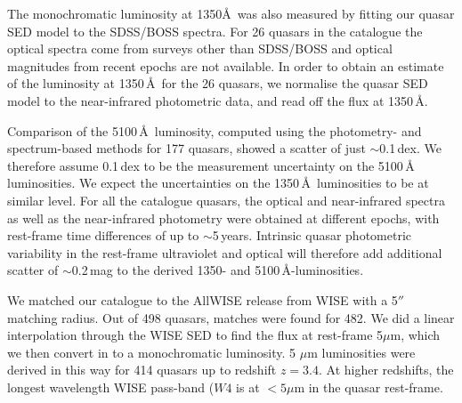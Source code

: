 The monochromatic luminosity at 1350\AA\, was also measured by fitting our quasar SED model to the SDSS/BOSS spectra. 
For 26 quasars in the catalogue the optical spectra come from surveys other than SDSS/BOSS and optical magnitudes from recent epochs are not available. 
In order to obtain an estimate of the luminosity at 1350\,\AA\, for the 26 quasars, we normalise the quasar SED model to the near-infrared photometric data, and read off the flux at 1350\,\AA. 

Comparison of the 5100\,\AA\, luminosity, computed using the photometry- and spectrum-based methods for 177 quasars, showed a scatter of just $\sim$0.1\,dex.
We therefore assume 0.1\,dex to be the measurement uncertainty on the 5100\,\AA\, luminosities.
We expect the uncertainties on the 1350\,\AA\, luminosities to be at similar level.  
For all the catalogue quasars, the optical and near-infrared spectra as well as the near-infrared photometry were obtained at different epochs, with rest-frame time differences of up to $\sim$5\,years. 
Intrinsic quasar photometric variability in the rest-frame ultraviolet and optical will therefore add additional scatter of $\sim$0.2\,mag \citep[e.g.][]{macleod10} to the derived 1350- and 5100\,\AA-luminosities.

We matched our catalogue to the AllWISE release from WISE with a 5$''$ matching radius. 
Out of 498 quasars, matches were found for 482. 
We did a linear interpolation through the WISE SED to find the flux at rest-frame 5$\mu$m, which we then convert in to a monochromatic luminosity. 
5 $\mu$m luminosities were derived in this way for 414 quasars up to redshift $z=3.4$. 
At higher redshifts, the longest wavelength WISE pass-band ($W4$ is at $<5\mu$m in the quasar rest-frame.

